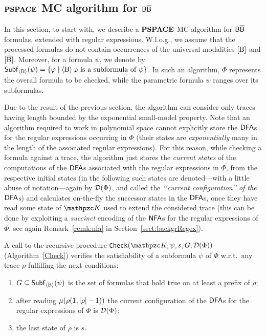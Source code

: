 \subsection{$\textbf{PSPACE}$ MC algorithm for $\mathsf{B}\mathsf{\overline{B}}$}\label{sect:PspAlgo}
In this section, to start with, we describe a $\textbf{PSPACE}$ MC algorithm for $\mathsf{B}\mathsf{\overline{B}}$ formulas, extended with regular expressions.  W.l.o.g., we assume that the processed formulas do not contain occurrences of the universal modalities $\operatorname{\mathopen[ B \mathclose]}$ and $\operatorname{\mathopen[ \overline{B} \mathclose]}$. Moreover, for a formula $\psi$, we denote by $\mathsf{Subf}_{\operatorname{\langle B\rangle}}(\psi)=\{\varphi\mid \operatorname{\langle B\rangle}\varphi \text{ is a subformula of } \psi\}$. In such an algorithm, $\Phi$ represents the overall formula to be checked, while the parametric formula $\psi$ ranges over its subformulas. 

Due to the result of the previous section, the algorithm can consider only traces having length bounded by the exponential small-model property. Note that
an algorithm required to work in polynomial space cannot explicitly
store the $\text{\sffamily DFA}$s for the regular expressions occurring in $\Phi$
(their states are \emph{exponentially} many in the length of the associated regular expressions). 
For this reason, while checking a formula against a trace, the algorithm just stores the \emph{current states} of the computations of the $\text{\sffamily DFA}$s associated with the regular expressions in $\Phi$, from the respective initial states 
(in the following such states are denoted---with a little abuse of notation---again by $\mathcal{D}(\Phi)$, and called the \emph{\lq\lq current configuration\rq\rq{} of the $\text{\sffamily DFA}$s}) and calculates on-the-fly the successor states in the $\text{\sffamily DFA}$s, once they have read some state of $\Ku$ used to extend the considered trace 
(this can be done by %
exploiting a \emph{succinct} encoding of the $\text{\sffamily NFA}$s for the regular expressions of $\Phi$, see again Remark~\ref{remk:nfa} in Section~\ref{sect:backgrRegex}).

A call to the recursive procedure \texttt{Check}$(\Ku,\psi,s,G,\Du(\Phi))$ (Algorithm~\ref{Check}) verifies the satisfiability of a subformula $\psi$ of $\Phi$ w.r.t.\ any trace $\rho$ fulfilling the next conditions:
\begin{enumerate}
    \item $G \subseteq \mathsf{Subf}_{\operatorname{\langle B\rangle}}(\psi)$ is the set of formulas that hold true on at least a prefix of $\rho$;
    \item after reading $\mu(\rho(1,|\rho|-1))$ the current configuration of the $\text{\sffamily DFA}$s for the regular expressions of $\Phi$ is $\mathcal{D}(\Phi)$; 
    \item the last state of $\rho$ is $s$.
\end{enumerate}

